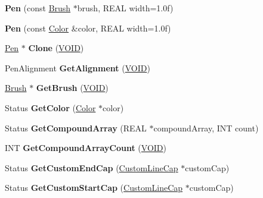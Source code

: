 \begin{DoxyCompactItemize}
\item 
\mbox{\label{class_pen_a7d089700a0ef2309bbc06e9eed35e867}} 
{\bfseries Pen} (const \hyperlink{class_brush}{Brush} $\ast$brush, R\+E\+AL width=1.\+0f)
\item 
\mbox{\label{class_pen_acc0e30fe8ce78a6154e97058fdc557c4}} 
{\bfseries Pen} (const \hyperlink{struct_color}{Color} \&color, R\+E\+AL width=1.\+0f)
\item 
\mbox{\label{class_pen_a5d9352cb6429cd3a29e88dea534fea2e}} 
\hyperlink{class_pen}{Pen} $\ast$ {\bfseries Clone} (\hyperlink{interfacevoid}{V\+O\+ID})
\item 
\mbox{\label{class_pen_aadeb0e5d5a460e881589b85d5ae71aba}} 
Pen\+Alignment {\bfseries Get\+Alignment} (\hyperlink{interfacevoid}{V\+O\+ID})
\item 
\mbox{\label{class_pen_a92f7eead9033afdee3d88346debb2c1b}} 
\hyperlink{class_brush}{Brush} $\ast$ {\bfseries Get\+Brush} (\hyperlink{interfacevoid}{V\+O\+ID})
\item 
\mbox{\label{class_pen_a0ebf9bb80c1e36dc54f7c73abf46de48}} 
Status {\bfseries Get\+Color} (\hyperlink{struct_color}{Color} $\ast$color)
\item 
\mbox{\label{class_pen_a97ea7dbcb24ba1e64bd74dc18069627a}} 
Status {\bfseries Get\+Compound\+Array} (R\+E\+AL $\ast$compound\+Array, I\+NT count)
\item 
\mbox{\label{class_pen_aa91543816e7d9b497367c40597ef23e0}} 
I\+NT {\bfseries Get\+Compound\+Array\+Count} (\hyperlink{interfacevoid}{V\+O\+ID})
\item 
\mbox{\label{class_pen_a243182fc661213adcb8bbcc82c6c08a5}} 
Status {\bfseries Get\+Custom\+End\+Cap} (\hyperlink{class_custom_line_cap}{Custom\+Line\+Cap} $\ast$custom\+Cap)
\item 
\mbox{\label{class_pen_a00584e214bfd9c7f906532448e7da2c1}} 
Status {\bfseries Get\+Custom\+Start\+Cap} (\hyperlink{class_custom_line_cap}{Custom\+Line\+Cap} $\ast$custom\+Cap)

\end{DoxyCompactItemize}
